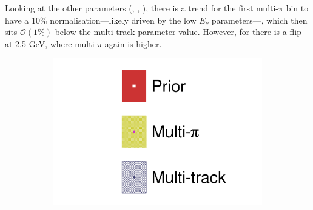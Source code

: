 Looking at the other parameters (\nue, \numubar, \nuebar), there is a trend for the first multi-$\pi$ bin to have a 10\% normalisation---likely driven by the low $E_\nu$ \numu parameters---, which then sits $\mathcal{O}(1\%)$ below the multi-track parameter value. However, for \nue there is a flip at 2.5 GeV, where multi-$\pi$ again is higher.
\begin{figure}[h]
	\centering
	\begin{subfigure}[t]{0.10\textwidth}
		\includegraphics[width=\textwidth,page=1, trim={0mm 0mm 0mm 9mm}, clip]{figures/mach3/2018/data/2018a_FixedCov_RedCov_Mpi_Data_merg_2018a_NewDetMatrix_OrderSwitched_Data2to8_ActualData_merge}
	\end{subfigure}
	

\end{figure}

